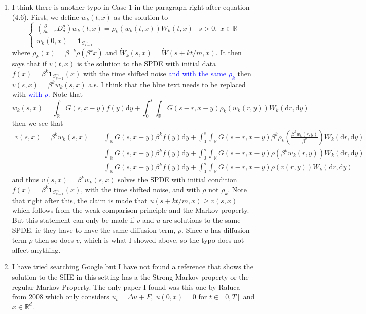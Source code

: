 \documentclass{article}
\numberwithin{equation}{section}
\newcommand{\R}{\mathbb{R}}
\newcommand{\ud}{\ensuremath{\mathrm{d}}}
\begin{document}
\begin{enumerate}
	\item
I think there is another typo in Case 1 in the paragraph right after equation (4.6). First, we define $w_k(t,x)$ as the solution to
	\[
		\begin{cases}
			(\frac{\partial}{\partial t} - _xD_\delta^a)w_k(t,x) = \rho_k(w_k(t,x)) \dot{W}_k(t,x) & s >0, \; x \in \R \\
			w_k(0,x) = \textbf{1}_{S_{k-1}^m}
		\end{cases}
	\]
where $\rho_k(x) = \beta^{-k}\rho(\beta^k x)$ and $\dot{W}_k(s,x) = \dot{W}(s + kt/m, x)$. It then says that if $v(t,x)$ is the solution to the SPDE with initial data $f(x) = \beta^{k}\textbf{1}_{S_{k-1}^m}(x)$ with the time shifted noise \textcolor{blue}{and with the same $\rho_k$} then $v(s,x) = \beta^k w_k(s,x)$ a.s. I think that the blue text needs to be replaced with \textcolor{blue}{with $\rho$.} Note that
	\[
		w_k(s,x) = \int_{\R} G(s,x-y)f(y) \ud y + \int_0^s\int_{\R} G(s-r,x-y) \rho_k(w_k(r,y)) W_k(\ud r, \ud y)
	\]
then we see that
	\begin{align*}
		v(s,x) = \beta^k w_k(s,x) &= \int_{\R} G(s,x-y) \beta^k f(y) \ud y + \int_0^s\int_{\R} G(s-r,x-y) \beta^k\rho_k\left(\frac{\beta^k w_k(r,y)}{\beta^k}\right) W_k(\ud r, \ud y) \\
		&= \int_{\R} G(s,x-y) \beta^k f(y) \ud y + \int_0^s\int_{\R} G(s-r,x-y) \rho(\beta^k w_k(r,y)) W_k(\ud r, \ud y) \\
		& = \int_{\R} G(s,x-y) \beta^k f(y) \ud y + \int_0^s\int_{\R} G(s-r,x-y) \rho(v(r,y)) W_k(\ud r, \ud y)
	\end{align*}
and thus $v(s,x) = \beta^k w_k(s,x) $ solves the SPDE with initial condition $f(x) = \beta^{k}\textbf{1}_{S_{k-1}^m}(x)$, with the time shifted noise, and with $\rho$ not $\rho_k$. Note that right after this, the claim is made that $u(s + kt/m, x) \ge v(s,x)$ which follows from the weak comparison principle and the Markov property. But this statement can only be made if $v$ and $u$ are solutions to the same SPDE, ie they have to have the same diffusion term, $\rho$. Since $u$ has diffusion term $\rho$ then so does $v$, which is what I showed above, so the typo does not affect anything.

	\item
I have tried searching Google but I have not found a reference that shows the solution to the SHE in this setting has a the Strong Markov property or the regular Markov Property. The only paper I found was this one \cite{BK08} by Raluca from 2008 which only considers $u_t = \Delta u + \dot{F}, \; u(0,x) = 0$ for $t \in [0,T]$ and $x \in \R^d$.


\end{enumerate}
\end{document}
